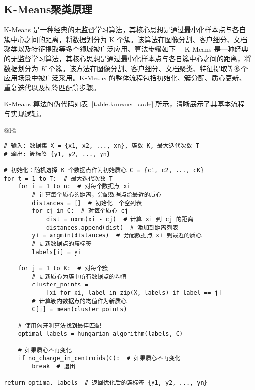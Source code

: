 \documentclass[master]{thesis-uestc}
\begin{document}
\subsection{K-Means聚类原理}
K-Means 是一种经典的无监督学习算法，其核心思想是通过最小化样本点与各自簇中心之间的距离，将数据划分为 K 个簇。该算法在图像分割、客户细分、文档聚类以及特征提取等多个领域被广泛应用。算法步骤如下：
K-Means 是一种经典的无监督学习算法，其核心思想是通过最小化样本点与各自簇中心之间的距离，将数据划分为 \(K\) 个簇。该方法在图像分割、客户细分、文档聚类、特征提取等多个应用场景中被广泛采用。K-Means 的整体流程包括初始化、簇分配、质心更新、重复迭代以及标签匹配等步骤。

K-Means 算法的伪代码如表~\ref{table:kmeans_code} 所示，清晰展示了其基本流程与实现逻辑。

\begin{table}[h]
    \caption{{KMeans算法伪代码}}
    {
    \begin{tabular}{@{}l@{}}
    \toprule
     \\
    \midrule
    \begin{lstlisting}[basicstyle=\fontspec{Times New Roman}, frame=none]
# 输入: 数据集 X = {x1, x2, ..., xn}, 簇数 K, 最大迭代次数 T
# 输出: 簇标签 {y1, y2, ..., yn}

# 初始化：随机选择 K 个数据点作为初始质心 C = {c1, c2, ..., cK}
for t = 1 to T:  # 最大迭代次数 T
    for i = 1 to n:  # 对每个数据点 xi
        # 计算每个质心的距离，分配数据点给最近的质心
        distances = []  # 初始化一个空列表
        for cj in C:  # 对每个质心 cj
            dist = norm(xi - cj)  # 计算 xi 到 cj 的距离
            distances.append(dist)  # 添加到距离列表
        yi = argmin(distances)  # 分配数据点 xi 到最近的质心
        # 更新数据点的簇标签
        labels[i] = yi
    
    for j = 1 to K:  # 对每个簇
        # 更新质心为簇中所有数据点的均值
        cluster_points = 
            [xi for xi, label in zip(X, labels) if label == j]
        # 计算簇内数据点的均值作为新质心
        C[j] = mean(cluster_points)
    
    # 使用匈牙利算法找到最佳匹配
    optimal_labels = hungarian_algorithm(labels, C)
    
    # 如果质心不再变化
    if no_change_in_centroids(C):  # 如果质心不再变化
        break  # 退出

return optimal_labels  # 返回优化后的簇标签 {y1, y2, ..., yn}
    \end{lstlisting} \\
    \bottomrule
    \end{tabular}
    }
    \label{table:kmeans_code}
\end{table}
\end{document}
